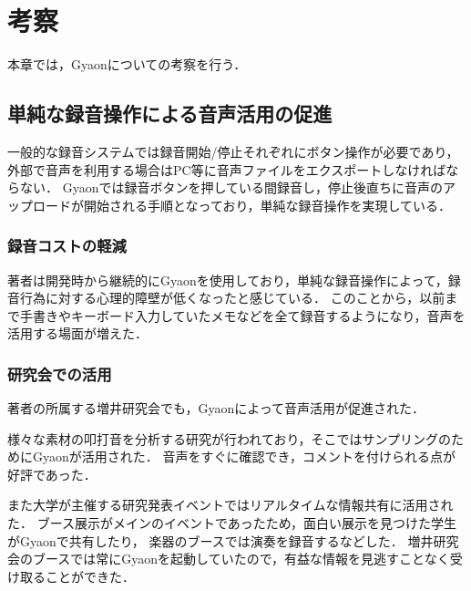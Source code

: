 \chapter{考察}
\label{chap:discussion}

本章では，Gyaonについての考察を行う．

\newpage

\section{単純な録音操作による音声活用の促進}
一般的な録音システムでは録音開始/停止それぞれにボタン操作が必要であり，
外部で音声を利用する場合はPC等に音声ファイルをエクスポートしなければならない．
Gyaonでは録音ボタンを押している間録音し，停止後直ちに音声のアップロードが開始される手順となっており，単純な録音操作を実現している．

\subsection{録音コストの軽減}

著者は開発時から継続的にGyaonを使用しており，単純な録音操作によって，録音行為に対する心理的障壁が低くなったと感じている．
このことから，以前まで手書きやキーボード入力していたメモなどを全て録音するようになり，音声を活用する場面が増えた．

\subsection{研究会での活用}
著者の所属する増井研究会でも，Gyaonによって音声活用が促進された．

様々な素材の叩打音を分析する研究が行われており，そこではサンプリングのためにGyaonが活用された．
音声をすぐに確認でき，コメントを付けられる点が好評であった．

また大学が主催する研究発表イベントではリアルタイムな情報共有に活用された．
ブース展示がメインのイベントであったため，面白い展示を見つけた学生がGyaonで共有したり，
楽器のブースでは演奏を録音するなどした．
増井研究会のブースでは常にGyaonを起動していたので，有益な情報を見逃すことなく受け取ることができた．

%


